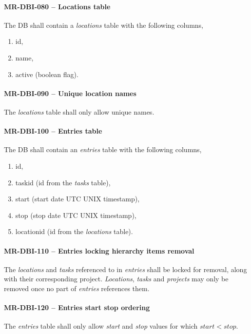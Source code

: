 \paragraph{MR-DBI-080 -- Locations table}
The \gls{DB} shall contain a \emph{locations} table with the following columns,
\begin{enumerate}
\item id,
\item name,
\item active (boolean flag).
\end{enumerate}

\paragraph{MR-DBI-090 -- Unique location names}
The \emph{locations} table shall only allow unique names.

\paragraph{MR-DBI-100 -- Entries table}
The \gls{DB} shall contain an \emph{entries} table with the following columns,
\begin{enumerate}
\item id,
\item task\textunderscore id (id from the \emph{tasks} table),
\item start (start date UTC UNIX timestamp),
\item stop (stop date UTC UNIX timestamp),
\item location\textunderscore id (id from the \emph{locations} table).
\end{enumerate}

\paragraph{MR-DBI-110 -- Entries locking hierarchy items removal}
The \emph{locations} and \emph{tasks} referenced to in \emph{entries} shall be
locked for removal, along with their corresponding project. \emph{Locations},
\emph{tasks} and \emph{projects} may only be removed once no part of
\emph{entries} references them.

\paragraph{MR-DBI-120 -- Entries start stop ordering}
The \emph{entries} table shall only allow \emph{start} and \emph{stop}
values for which $start < stop$.

